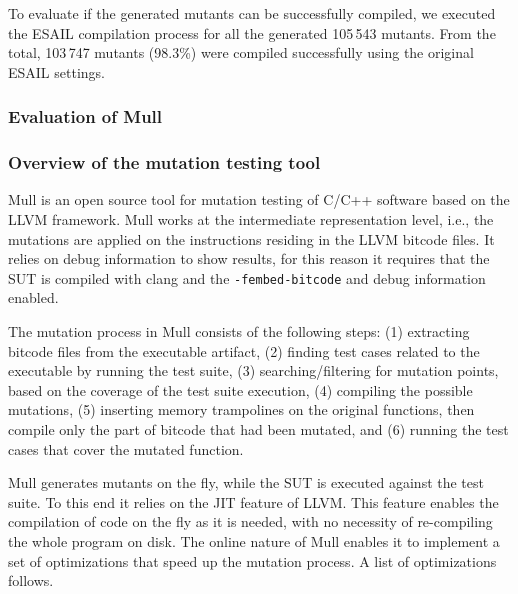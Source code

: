 










To evaluate if the generated mutants can be successfully compiled, we executed the ESAIL compilation process for all the generated 105\,543 mutants. From the total, 103\,747 mutants (98.3\%) were compiled successfully using the original ESAIL settings.

\subsubsection{Evaluation of Mull}
\label{subsec:mull}

\subsubsection{Overview of the mutation testing tool}

Mull is an open source tool for mutation testing of C/C++ software based on the LLVM framework. Mull works at the intermediate representation level, i.e., the mutations are applied on the instructions residing in the LLVM bitcode files. It relies on debug information to show results, for this reason it requires that the SUT is compiled with clang and the \texttt{-fembed-bitcode} and debug information enabled. 

The mutation process in Mull consists of the following steps: (1) extracting bitcode files from the executable artifact, (2) finding test cases related to the executable by running the test suite, (3) searching/filtering for mutation points, based on the coverage of the test suite execution, (4) compiling the possible mutations, (5) inserting memory trampolines on the original functions, then compile only the part of bitcode that had been mutated, and (6) running the test cases that cover the mutated function.

Mull generates mutants on the fly, while the SUT is executed against the test suite. To this end it relies on the JIT feature of LLVM. This feature enables the compilation of code on the fly as it is needed, with no necessity of re-compiling the whole program on disk. The online nature of Mull enables it to implement a set of optimizations that speed up the mutation process. A list of optimizations follows.

